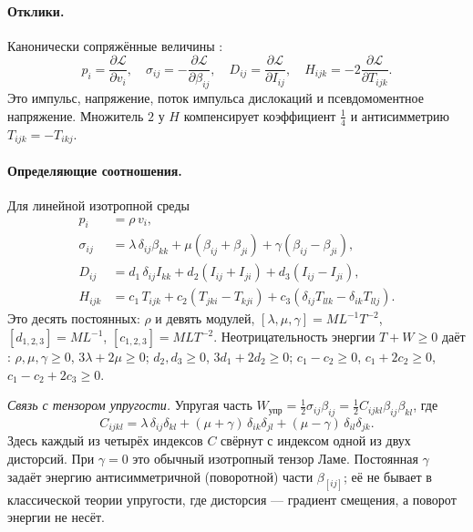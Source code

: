 \documentclass[12pt,a4paper]{article}
\begin{document}
\paragraph{Отклики.} Канонически сопряжённые величины \cite[ур.~(4)]{lazar2010pla}:
\begin{equation}
p_i=\frac{\partial\mathcal L}{\partial v_i},\quad
\sigma_{ij}=-\frac{\partial\mathcal L}{\partial\beta_{ij}},\quad
D_{ij}=\frac{\partial\mathcal L}{\partial I_{ij}},\quad
H_{ijk}=-2\frac{\partial\mathcal L}{\partial T_{ijk}}.
\label{eq:responses}
\end{equation}
Это импульс, напряжение, поток импульса дислокаций и псевдомоментное напряжение.
Множитель $2$ у $H$ компенсирует коэффициент $\tfrac14$ и антисимметрию
$T_{ijk}=-T_{ikj}$.

\paragraph{Определяющие соотношения.} Для линейной изотропной среды
\cite[ур.~(10)--(13)]{lazar2010pla}
\begin{equation}
\begin{aligned}
p_i&=\rho\,v_i,\\
\sigma_{ij}&=\lambda\,\delta_{ij}\beta_{kk}+\mu(\beta_{ij}+\beta_{ji})+\gamma(\beta_{ij}-\beta_{ji}),\\
D_{ij}&=d_1\,\delta_{ij}I_{kk}+d_2(I_{ij}+I_{ji})+d_3(I_{ij}-I_{ji}),\\
H_{ijk}&=c_1\,T_{ijk}+c_2(T_{jki}-T_{kji})+c_3(\delta_{ij}T_{llk}-\delta_{ik}T_{llj}).
\end{aligned}
\label{eq:constit}
\end{equation}
Это десять постоянных: $\rho$ и девять модулей, $[\lambda,\mu,\gamma]=ML^{-1}T^{-2}$,
$[d_{1,2,3}]=ML^{-1}$, $[c_{1,2,3}]=MLT^{-2}$. Неотрицательность энергии
$T+W\ge0$ даёт \cite[ур.~(14)]{lazar2010pla}: $\rho,\mu,\gamma\ge0$,
$3\lambda+2\mu\ge0$; $d_2,d_3\ge0$, $3d_1+2d_2\ge0$; $c_1-c_2\ge0$,
$c_1+2c_2\ge0$, $c_1-c_2+2c_3\ge0$.

\textit{Связь с тензором упругости.} Упругая часть
$W_{\text{упр}}=\tfrac12\sigma_{ij}\beta_{ij}=\tfrac12 C_{ijkl}\beta_{ij}\beta_{kl}$, где
\[
C_{ijkl}=\lambda\,\delta_{ij}\delta_{kl}+(\mu+\gamma)\,\delta_{ik}\delta_{jl}+(\mu-\gamma)\,\delta_{il}\delta_{jk}.
\]
Здесь каждый из четырёх индексов $C$ свёрнут с индексом одной из двух дисторсий.
При $\gamma=0$ это обычный изотропный тензор Ламе. Постоянная $\gamma$ задаёт
энергию антисимметричной (поворотной) части $\beta_{[ij]}$; её не бывает в
классической теории упругости, где дисторсия --- градиент смещения, а поворот
энергии не несёт.
\end{document}
